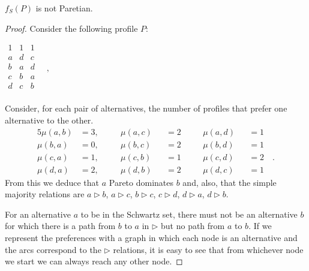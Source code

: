 \begin{theorem}
	$f_{S}(P)$ is not Paretian.
\end{theorem}
\begin{proof}
	\label{ex:schwartzPareto}
	Consider the following profile $P$:
	\begin{center}
		$
		\begin{array}{ccc}
			1 & 1 & 1 \\
			a &	d & c \\
			b &	a & d \\
			c &	b & a \\
			d & c & b \\
		\end{array} \quad, 
		$
	\end{center}
	Consider, for each pair of alternatives, the number of profiles that prefer one alternative to the other.
	\begin{alignat*}{5}
		\mu(a,b)&=3, \quad && \mu(a,c)&&=2  \quad && \mu(a,d)&&=1 \\ 
		\mu(b,a)&=0, \quad && \mu(b,c)&&=2  \quad && \mu(b,d)&&=1  \\
		\mu(c,a)&=1, \quad && \mu(c,b)&&=1  \quad && \mu(c,d)&&=2  \quad.\\
		\mu(d,a)&=2, \quad && \mu(d,b)&&=2  \quad && \mu(d,c)&&=1 
	\end{alignat*}
	From this we deduce that $a$ Pareto dominates $b$ and, also, that the simple majority relations are $a \rhd b$, $a \rhd c$, $b \rhd c$, $c \rhd d$, $d \rhd a$, $d \rhd b$.
	
	For an alternative $a$ to be in the Schwartz set, there must not be an alternative $b$ for which there is a path from $b$ to $a$ in $\rhd$ but no path from $a$ to $b$.
	If we represent the preferences with a graph in which each node is an alternative and the arcs correspond to the $\rhd$ relations, it is easy to see that from whichever node we start we can always reach any other node.

	\begin{minipage}{.45\textwidth}
	\raggedright
\end{minipage}
\end{proof}
